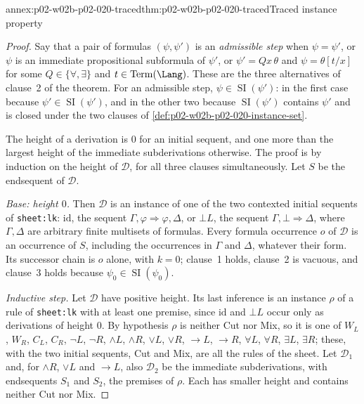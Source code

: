 \begin{annexitem}{annex:p02-w02b-p02-020-traced}{thm:p02-w02b-p02-020-traced}{Traced instance property}
\begin{proof}
Say that a pair of formulas \((\psi,\psi')\) is an \emph{admissible step}
when \(\psi=\psi'\), or \(\psi\) is an immediate propositional subformula of
\(\psi'\), or \(\psi'=Qx\,\theta\) and \(\psi=\theta[t/x]\) for some
\(Q\in\{\forall,\exists\}\) and \(t\in\operatorname{Term}(\Lang)\).  These are
the three alternatives of clause~2 of the theorem.  For an admissible step,
\(\psi\in\operatorname{SI}(\psi')\): in the first case because
\(\psi'\in\operatorname{SI}(\psi')\), and in the other two because
\(\operatorname{SI}(\psi')\) contains \(\psi'\) and is closed under the two
clauses of \cref{def:p02-w02b-p02-020-instance-set}.

The height of a derivation is \(0\) for an initial sequent, and one more than
the largest height of the immediate subderivations otherwise.  The proof is
by induction on the height of \(\mathcal D\), for all three clauses
simultaneously.  Let \(S\) be the endsequent of \(\mathcal D\).

\emph{Base: height \(0\).}  Then \(\mathcal D\) is an instance of one of the
two contexted initial sequents of
\texttt{sheet:lk}: \(\mathrm{id}\), the sequent
\(\Gamma,\varphi\Rightarrow\varphi,\Delta\), or \(\bot L\), the sequent
\(\Gamma,\bot\Rightarrow\Delta\), where \(\Gamma,\Delta\) are arbitrary
finite multisets of formulas.  Every formula occurrence \(o\) of
\(\mathcal D\) is an occurrence of \(S\), including the occurrences in
\(\Gamma\) and \(\Delta\), whatever their form.  Its successor chain is
\(o\) alone, with \(k=0\); clause~1 holds, clause~2 is vacuous, and clause~3
holds because \(\psi_0\in\operatorname{SI}(\psi_0)\).

\emph{Inductive step.}  Let \(\mathcal D\) have positive height.  Its last
inference is an instance \(\rho\) of a rule of
\texttt{sheet:lk} with at least one premise, since
\(\mathrm{id}\) and \(\bot L\) occur only as derivations of height \(0\).  By
hypothesis \(\rho\) is neither Cut nor Mix, so it is one of \(W_L\), \(W_R\),
\(C_L\), \(C_R\), \(\neg L\), \(\neg R\), \(\land L\), \(\land R\),
\(\lor L\), \(\lor R\), \(\to L\), \(\to R\), \(\forall L\), \(\forall R\),
\(\exists L\), \(\exists R\); these, with the two initial sequents, Cut and
Mix, are all the rules of the sheet.  Let \(\mathcal D_1\) and, for
\(\land R\), \(\lor L\) and \(\to L\), also \(\mathcal D_2\) be the immediate
subderivations, with endsequents \(S_1\) and \(S_2\), the premises of
\(\rho\).  Each has smaller height and contains neither Cut nor Mix.


\end{proof}
\end{annexitem}
